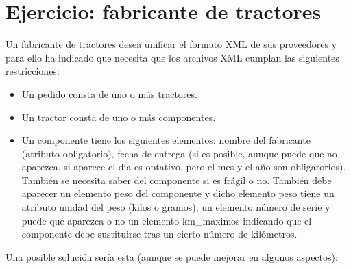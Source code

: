 \documentclass[letterpaper,10pt,spanish]{sphinxmanual}
\begin{document}
\section{Ejercicio: fabricante de tractores}
\label{\detokenize{tema5:ejercicio-fabricante-de-tractores}}
Un fabricante de tractores desea unificar el formato XML de sus proveedores y para ello ha indicado que necesita que los archivos XML cumplan las siguientes restricciones:
\begin{itemize}
\item {} 
Un pedido consta de uno o más tractores.

\item {} 
Un tractor consta de uno o más componentes.

\item {} 
Un componente tiene los siguientes elementos: nombre del fabricante (atributo obligatorio), fecha de entrega  (si es posible, aunque puede que no aparezca, si aparece el dia es optativo, pero el mes y el año son obligatorios). También se necesita saber del componente si es frágil o no. También debe aparecer un elemento peso del componente y dicho elemento peso tiene un atributo unidad del peso (kilos o gramos), un elemento número de serie y puede que aparezca o no un elemento km\_maximos indicando que el componente debe sustituirse tras un cierto número de kilómetros.

\end{itemize}

Una posible solución sería esta (aunque se puede mejorar en algunos aspectos):
\end{document}
